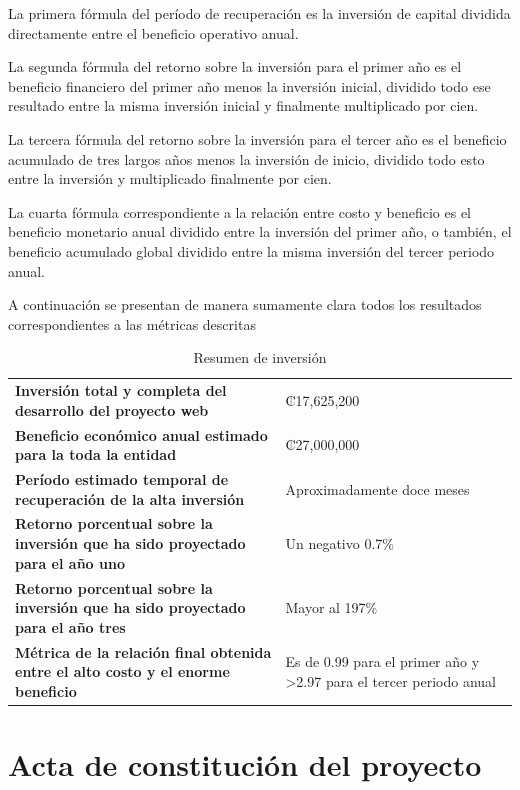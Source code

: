 \documentclass[11pt,spanish]{article}
\begin{document}
La primera fórmula del período de recuperación es la inversión de capital dividida directamente entre el beneficio operativo anual.

La segunda fórmula del retorno sobre la inversión para el primer año es el beneficio financiero del primer año menos la inversión inicial, dividido todo ese resultado entre la misma inversión inicial y finalmente multiplicado por cien.

La tercera fórmula del retorno sobre la inversión para el tercer año es el beneficio acumulado de tres largos años menos la inversión de inicio, dividido todo esto entre la inversión y multiplicado finalmente por cien.

La cuarta fórmula correspondiente a la relación entre costo y beneficio es el beneficio monetario anual dividido entre la inversión del primer año, o también, el beneficio acumulado global dividido entre la misma inversión del tercer periodo anual.

A continuación se presentan de manera sumamente clara todos los resultados correspondientes a las métricas descritas

\begin{table}[H]
\centering
\small
\caption{Resumen de inversión}\label{tab:resumen-inversion}
\begin{tabularx}{\textwidth}{Y p{5.2cm}}
\toprule
\textbf{Inversión total y completa del desarrollo del proyecto web} & ₡17,625,200 \\
\textbf{Beneficio económico anual estimado para la toda la entidad} & ₡27,000,000 \\
\textbf{Período estimado temporal de recuperación de la alta inversión} & Aproximadamente doce meses \\
\textbf{Retorno porcentual sobre la inversión que ha sido proyectado para el año uno} & Un negativo 0.7\% \\
\textbf{Retorno porcentual sobre la inversión que ha sido proyectado para el año tres} & Mayor al 197\% \\
\textbf{Métrica de la relación final obtenida entre el alto costo y el enorme beneficio} & Es de 0.99 para el primer año y \textgreater{}2.97 para el tercer periodo anual \\
\bottomrule
\end{tabularx}
\end{table}

\newpage
\section{Acta de constitución del proyecto}
\end{document}
